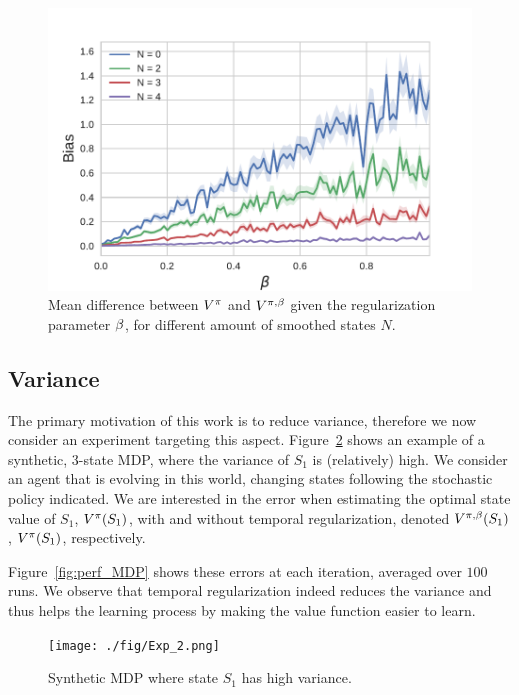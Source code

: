 \begin{figure}
	\centering
	\includegraphics[scale=0.7]{./fig/Bias_N.pdf}
\caption[Bias induced by Temporal Regularization]{Mean difference between $V^{\pi}$ and $V^{\pi,\beta}$ given the regularization parameter $\beta$, for different amount of smoothed states $N$.}
\label{fig:mod}
\end{figure}


\subsection{Variance}
\label{sec:expe:variance}
The primary motivation of this work is to reduce variance, therefore we now consider an experiment  targeting this aspect. Figure~\ref{fig:MDP} shows an example of a synthetic, 3-state MDP, where the variance of $S_1$ is (relatively) high. We consider an agent that is evolving in this world, changing states following the stochastic policy indicated. We are interested in the error when estimating the optimal state value of $S_1$, $V^{\pi}(S_1)$, with and without temporal regularization, denoted $V^{\pi,\beta}(S_1)$, $V^{\pi} (S_1)$, respectively.

Figure~\ref{fig:perf_MDP} shows these errors at each iteration, averaged over $100$ runs. We observe that temporal regularization indeed reduces the variance and thus helps the learning process by making the value function easier to learn.

\begin{figure}
	\centering

	\texttt{[image: ./fig/Exp\_2.png]}
\caption[Synthetic MDP]{Synthetic MDP where state $S_1$ has high variance.}
\label{fig:MDP}
\end{figure}

